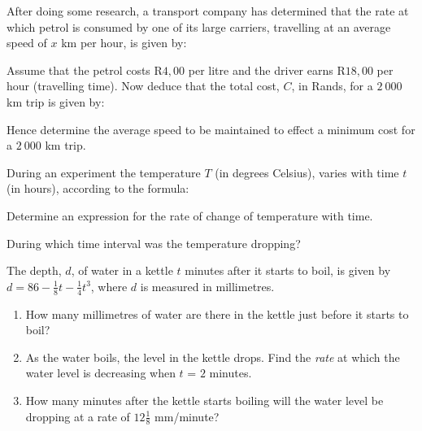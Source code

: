 \begin{eocexercises}{}
\begin{enumerate}
\item{
\begin{enumerate}{
\item{After doing some research, a transport company has determined that the rate at which petrol is consumed by one of its large carriers, travelling at an average speed of $x$ km per hour, is given by:
}
\begin{enumerate}{
\item{Assume that the petrol costs R$4,00$ per litre and the driver earns R$18,00$ per hour (travelling time). Now deduce that the total cost, $C$, in Rands, for a $2~000$ km trip is given by:
}
\item{Hence determine the average speed to be maintained to effect a minimum
cost for a $2~000$ km trip.}}
\end{enumerate}
\item{During an experiment the temperature $T$ (in degrees Celsius), varies with time $t$ (in hours), according to the formula:
}
\begin{enumerate}{
\item{Determine an expression for the rate of change of temperature with time.}
\item{During which time interval was the temperature dropping?}}
\end{enumerate}}
\end{enumerate}}

\item{The depth, $d$, of water in a kettle $t$ minutes after it starts to boil, is given by $d = 86 - \tfrac{1}{8}t - \tfrac{1}{4}t^3$, where $d$ is measured in millimetres.
\begin{enumerate}
\item{How many millimetres of water are there in the kettle just before it starts to boil?}
\item{As the water boils, the level in the kettle drops.
Find the \textit{rate} at which the water level is decreasing when $t$ = $2$ minutes.}
\item{How many minutes after the kettle starts boiling will the water level be dropping at a rate of $12 \tfrac{1}{8}$
mm/minute?}
\end{enumerate}}


\end{enumerate}










\end{eocexercises}
